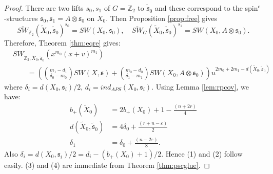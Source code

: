 \documentclass{amsart}
\theoremstyle{definition}
\theoremstyle{remark}
\numberwithin{equation}{section}
\begin{document}
\begin{proof}
There are two lifts $s_0,s_1$ of $G = \mathbb{Z}_2$ to $\widetilde{\mathfrak{s}}_0$ and these correspond to the spin$^c$-structures $\mathfrak{s}_0, \mathfrak{s}_1 = A \otimes \mathfrak{s}_0$ on $X_0$. Then Proposition \ref{prop:free} gives
\[
\overline{SW}_{\mathbb{Z}_2}(\widetilde{X}_0 , \widetilde{\mathfrak{s}}_0)^{s_0} = SW(X_0 , \mathfrak{s}_0), \quad \overline{SW}_{G}(\widetilde{X}_0 , \widetilde{\mathfrak{s}}_0)^{s_1} = SW(X_0 , A \otimes \mathfrak{s}_0).
\]
Therefore, Theorem \ref{thm:eqre} gives:
\begin{align*}
& SW_{\mathbb{Z}_2 , \widetilde{X}_0 , \widetilde{\mathfrak{s}}_0}( x^{m_0}(x+v)^{m_1} ) \\
& \quad \quad = \left( \binom{m_1-d_1}{\delta_0-m_0}SW(X , \mathfrak{s}) + \binom{m_0-d_0}{\delta_1 - m_1}SW(X_0 , A \otimes \mathfrak{s}_0) \right)u^{2m_0+2m_1 - d(\widetilde{X}_0 , \widetilde{\mathfrak{s}}_0)}
\end{align*}
where $\delta_i = d(X_0 , \mathfrak{s}_i)/2$, $d_i = ind_{APS}(X_0 , \mathfrak{s}_i)$. Using Lemma \ref{lem:rpcov}, we have:
\begin{align*}
b_+(\widetilde{X}_0) &= 2b_+(X_0) + 1 - \frac{(n+2r)}{4} \\
d(\widetilde{X}_0 , \widetilde{\mathfrak{s}}_0) &= 4 \delta_0 + \frac{(r+n-\varepsilon)}{2} \\
\delta_1 &= \delta_0 + \frac{(n-2\varepsilon)}{8}.
\end{align*}
Also $\delta_i = d(X_0 , \mathfrak{s}_i)/2 = d_i - (b_+(X_0)+1)/2$. Hence (1) and (2) follow easily. (3) and (4) are immediate from Theorem \ref{thm:pscglue}.
\end{proof}
\end{document}
